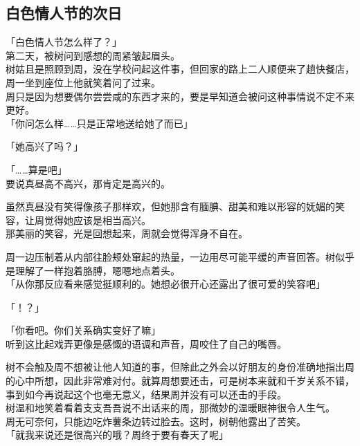 \subsection{白色情人节的次日}

「白色情人节怎么样了？」\\

第二天，被树问到感想的周紧皱起眉头。\\

树姑且是照顾到周，没在学校问起这件事，但回家的路上二人顺便来了趟快餐店，周一坐到座位上他就笑着问了过来。\\

周只是因为想要偶尔尝尝咸的东西才来的，要是早知道会被问这种事情说不定不来更好。\\

「你问怎么样……只是正常地送给她了而已」

「她高兴了吗？」

「……算是吧」\\

要说真昼高不高兴，那肯定是高兴的。

虽然真昼没有笑得像孩子那样欢，但她那含有腼腆、甜美和难以形容的妩媚的笑容，让周觉得她应该是相当高兴。\\

那美丽的笑容，光是回想起来，周就会觉得浑身不自在。

周一边压制着从内部往脸颊处窜起的热量，一边用尽可能平缓的声音回答。树似乎是理解了一样抱着胳膊，嗯嗯地点着头。\\

「从你那反应看来感觉挺顺利的。她想必很开心还露出了很可爱的笑容吧」

「！？」

「你看吧。你们关系确实变好了嘛」\\

听到这比起戏弄更像是感慨的语调和声音，周咬住了自己的嘴唇。

树不会触及周不想被让他人知道的事，但除此之外会以好朋友的身份准确地指出周的心中所想，因此非常难对付。就算周想要还击，可是树本来就和千岁关系不错，事到如今再说起这个也毫无意义，结果周并没有可以还击的手段。\\

树温和地笑着看着支支吾吾说不出话来的周，那微妙的温暖眼神很令人生气。\\

周无可奈何，只能边吃炸薯条边转过脸去。这时，树朝他露出了苦笑。\\

「就我来说还是很高兴的哦？周终于要有春天了呢」

